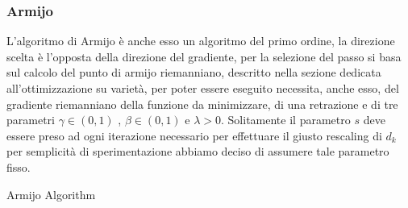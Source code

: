 \documentclass[a4paper, 12pt]{article}
\begin{document}
\subsubsection{Armijo}
L'algoritmo di Armijo è anche esso un algoritmo del primo ordine, la direzione scelta è l'opposta della direzione del gradiente, per la selezione del passo si basa sul calcolo del punto di armijo riemanniano, descritto nella sezione dedicata all'ottimizzazione su varietà, per poter essere eseguito necessita, anche esso, del gradiente riemanniano della funzione da minimizzare, di una retrazione e di tre parametri $\gamma \in (0,1)$ , $\beta \in (0,1)$ e $\lambda > 0$. Solitamente il parametro $s$ deve essere preso ad ogni iterazione necessario per effettuare il giusto rescaling di $d_k$ per semplicità di sperimentazione abbiamo deciso di assumere tale parametro fisso.\\
\begin{center}
\begin{algorithm}[H]
\SetAlgoLined
{}
\caption{Armijo Algorithm}
\end{algorithm}
\end{center}
\end{document}
